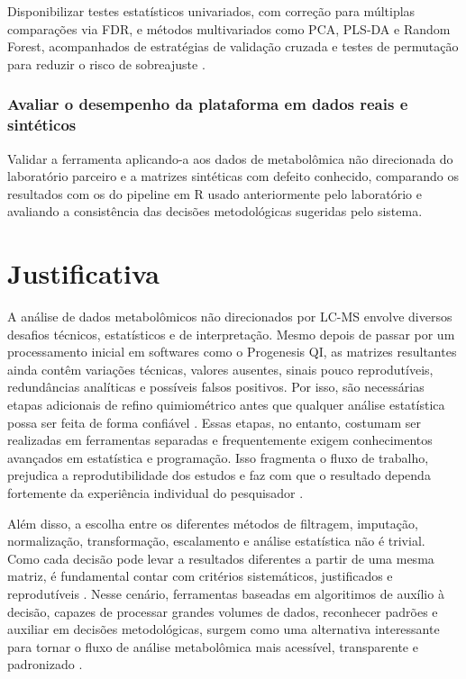 Disponibilizar testes estatísticos univariados, com correção para múltiplas comparações via FDR, e métodos multivariados como PCA, PLS-DA e Random Forest, acompanhados de estratégias de validação cruzada e testes de permutação para reduzir o risco de sobreajuste \cite{worley2013multivariate}.

\subsubsection{Avaliar o desempenho da plataforma em dados reais e sintéticos}
 
Validar a ferramenta aplicando-a aos dados de metabolômica não direcionada do laboratório parceiro e a matrizes sintéticas com defeito conhecido, comparando os resultados com os do pipeline em R usado anteriormente pelo laboratório e avaliando a consistência das decisões metodológicas sugeridas pelo sistema.

\section{Justificativa}
 
A análise de dados metabolômicos não direcionados por LC-MS envolve diversos desafios técnicos, estatísticos e de interpretação. Mesmo depois de passar por um processamento inicial em softwares como o Progenesis QI, as matrizes resultantes ainda contêm variações técnicas, valores ausentes, sinais pouco reprodutíveis, redundâncias analíticas e possíveis falsos positivos. Por isso, são necessárias etapas adicionais de refino quimiométrico antes que qualquer análise estatística possa ser feita de forma confiável \cite{mahieu2017systems}. Essas etapas, no entanto, costumam ser realizadas em ferramentas separadas e frequentemente exigem conhecimentos avançados em estatística e programação. Isso fragmenta o fluxo de trabalho, prejudica a reprodutibilidade dos estudos e faz com que o resultado dependa fortemente da experiência individual do pesquisador \cite{weber2017computational}.
 
Além disso, a escolha entre os diferentes métodos de filtragem, imputação, normalização, transformação, escalamento e análise estatística não é trivial. Como cada decisão pode levar a resultados diferentes a partir de uma mesma matriz, é fundamental contar com critérios sistemáticos, justificados e reprodutíveis \cite{diguida2016non}. Nesse cenário, ferramentas baseadas em algoritimos de auxílio à decisão, capazes de processar grandes volumes de dados, reconhecer padrões e auxiliar em decisões metodológicas, surgem como uma alternativa interessante para tornar o fluxo de análise metabolômica mais acessível, transparente e padronizado \cite{sen2021deep}.
 
